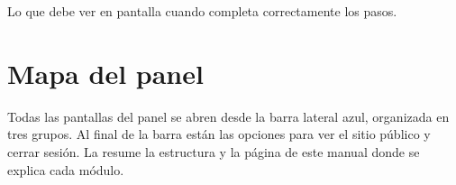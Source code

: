 \begin{resultado}
Lo que debe ver en pantalla cuando completa correctamente los pasos.
\end{resultado}

\section{Mapa del panel}\label{sec:mapa}

Todas las pantallas del panel se abren desde la barra lateral azul, organizada en tres grupos.
Al final de la barra están las opciones para ver el sitio público y cerrar sesión. La
 resume la estructura y la página de este manual donde se explica cada
módulo.

\newcommand{\modmapa}[3]{{\color{azul}\ico{#1}}\hspace{0.5em}{\fontseries{sb}\selectfont\footnotesize #2}%
  \hfill{\scriptsize\color{pizarra}\pageref*{#3}}}

